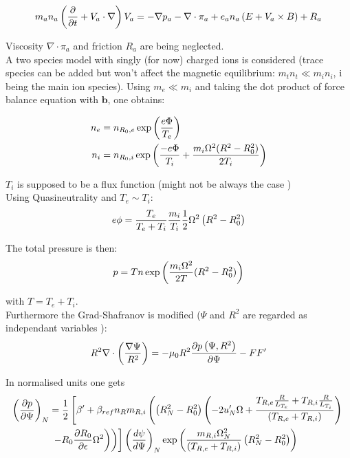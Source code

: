 \begin{align}
m_an_a\left(\frac{\partial }{\partial t}+V_a\cdot \nabla \right)V_a = -\nabla p_a - \nabla \cdot \pi_a + e_a n_a\left(E+V_a\times B\right)+R_a
\end{align}

Viscosity $\nabla \cdot \pi_a$ and friction $R_a$ are being neglected. \\
A two species model with singly (for now) charged ions is considered (trace species can be added but won't affect the magnetic equilibrium: $m_tn_t \ll m_in_i$, i being the main ion species). Using $m_e \ll m_i$ and taking the dot product of force balance equation with $\mathbf b$, one obtains:

\begin{align}
n_e &= n_{R_0,e}\exp{\left({e \Phi \over T_e}\right)} \\
n_i &= n_{R_0,i}\exp{\left({-e \Phi \over T_i }+ {m_i\Omega^2(R^2 - R_0^2)\over 2T_i}\right)}
\end{align}

$T_i$ is supposed to be a flux function (might not be always the case \cite{THYA06}) \\
Using Quasineutrality and $T_e \sim T_i$:
\begin{align}
e\phi = {T_e \over T_e + T_i}{m_i \over T_i}{1 \over 2}\Omega^2\left(R^2-R_0^2\right)
\end{align}

The total pressure is then:
\begin{align}
p = Tn\exp{\left({m_i\Omega^2 \over 2 T}(R^2-R_0^2)\right)}
\end{align}

with $T = T_e + T_i$.\\
Furthermore the Grad-Shafranov is modified ($\Psi$ and $R^2$ are regarded as independant variables \cite{THYA06}):
\begin{equation}
R^2 \nabla \cdot \left({\nabla \Psi \over R^2}\right) = -\mu_0 R^2 \frac{\partial  p \left(\Psi,R^2\right)}{\partial \Psi} - FF'
\end{equation}

In normalised units one gets 
\begin{align} \label{eq:rota}
\left(\frac{\partial  p}{\partial \Psi}\right)_N &= {1 \over 2}\left[\beta' + \beta_{ref} n_Rm_{R,i}
\left(\left(R_N^2-R_0^2\right)\left(-2u_N' \Omega + {T_{R,e}{R\over L_{T_e}} + T_{R,i}{R \over L_{T_i}}\over \left(T_{R,e}+T_{R,i}\right)}\right)\right.\right. \nonumber \\
&\left.\left.\left. -R_0\frac{\partial  R_0}{\partial \epsilon}\Omega^2\right)\right)\right]\left({d \psi \over d \Psi}\right)_N\exp{\left({m_{R,i}\Omega_N^2 \over \left(T_{R,e}+T_{R,i}\right)}\left(R_N^2-R_0^2\right)\right)}
\end{align}

